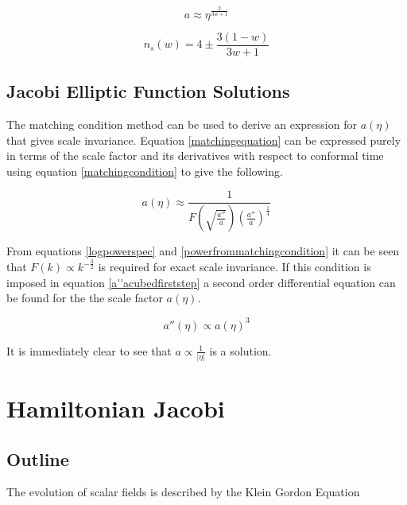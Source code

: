\documentclass[12pt]{article} %
\begin{document}
\begin{equation}\label{generalisedscalefactorinw}
a\approx\eta^{\frac{2}{3w+1}}
\end{equation}

\begin{equation}\label{nsintermsofw}
n_{s}(w)=4\pm\frac{3(1-w)}{3w+1}
\end{equation}

\subsection{Jacobi Elliptic Function Solutions}

The matching condition method can be used to derive an expression for $a(\eta)$ that gives scale invariance. Equation \ref{matchingequation} can be expressed purely in terms of the scale factor and its derivatives with respect to conformal time using equation \ref{matchingcondition} to give the following.

\begin{equation}\label{a''acubedfirststep}
a(\eta) \approx \frac{1}{F\left(\sqrt{\frac{a''}{a}}\right)\left(\frac{a''}{a}\right)^{\frac{1}{4}}}
\end{equation}

From equations \ref{logpowerspec} and \ref{powerfrommatchingcondition} it can be seen that $F(k)\propto k^{-\frac{3}{2}}$ is required for exact scale invariance. If this condition is imposed in equation \ref{a''acubedfirststep} a second order differential equation can be found for the the scale factor $a(\eta)$.

\begin{equation}\label{aproptoacubed}
a''(\eta) \propto a(\eta)^{3}
\end{equation}

It is immediately clear to see that $ a \propto \frac{1}{| \eta |} $ is a solution.


\section{Hamiltonian Jacobi}

\subsection{Outline}

The evolution of scalar fields is described by the Klein \cite{goldstein} Gordon Equation
\end{document}
